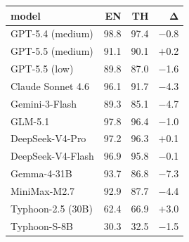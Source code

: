\begin{tabular}{@{}lrrr@{}}
\toprule
\textbf{model} & \textbf{EN} & \textbf{TH} & $\boldsymbol{\Delta}$ \\
\midrule
GPT-5.4 (medium) & 98.8 & 97.4 & $-$0.8 \\
GPT-5.5 (medium) & 91.1 & 90.1 & $+$0.2 \\
GPT-5.5 (low) & 89.8 & 87.0 & $-$1.6 \\
Claude Sonnet 4.6 & 96.1 & 91.7 & $-$4.3 \\
Gemini-3-Flash & 89.3 & 85.1 & $-$4.7 \\
GLM-5.1 & 97.8 & 96.4 & $-$1.0 \\
DeepSeek-V4-Pro & 97.2 & 96.3 & $+$0.1 \\
DeepSeek-V4-Flash & 96.9 & 95.8 & $-$0.1 \\
Gemma-4-31B & 93.7 & 86.8 & $-$7.3 \\
MiniMax-M2.7 & 92.9 & 87.7 & $-$4.4 \\
Typhoon-2.5 (30B) & 62.4 & 66.9 & $+$3.0 \\
Typhoon-S-8B & 30.3 & 32.5 & $-$1.5 \\
\bottomrule
\end{tabular}
